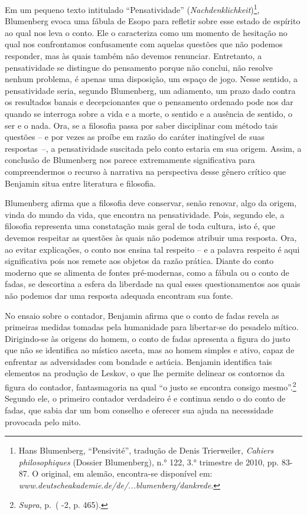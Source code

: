 Em um pequeno texto intitulado ``Pensatividade''
(\emph{Nachdenklichkeit})\footnote{Hans Blumenberg, ``Pensivité'',
  tradução de Denis Trierweiler, \emph{Cahiers philosophiques} (Dossier
  Blumenberg), n.° 122, 3.° trimestre de 2010, pp. 83-87. O original, em alemão,
  encontra-se disponível em: \emph{www.deutscheakademie.de/de/...blumenberg/dankrede}.}, Blumenberg
evoca uma fábula de Esopo para refletir sobre esse estado de espírito ao
qual nos leva o conto. Ele o caracteriza como um momento de hesitação no
qual nos confrontamos confusamente com aquelas questões que não podemos
responder, mas às quais também não devemos renunciar. Entretanto, a
pensatividade se distingue do pensamento porque não conclui, não resolve
nenhum problema, é apenas uma disposição, um espaço de jogo. Nesse
sentido, a pensatividade seria, segundo Blumenberg, um adiamento, um
prazo dado contra os resultados banais e decepcionantes que o pensamento
ordenado pode nos dar quando se interroga sobre a vida e a morte, o
sentido e a ausência de sentido, o ser e o nada. Ora, se a filosofia
passa por saber disciplinar com método tais questões -- e por vezes as
proíbe em razão do caráter inatingível de suas respostas~--, a
pensatividade suscitada pelo conto estaria em sua origem. Assim, a
conclusão de Blumenberg nos parece extremamente significativa para
compreendermos o recurso à narrativa na perspectiva desse gênero crítico
que Benjamin situa entre literatura e filosofia.

Blumenberg afirma que a filosofia deve conservar, senão renovar, algo da
origem, vinda do mundo da vida, que encontra na pensatividade. Pois,
segundo ele, a filosofia representa uma constatação mais geral de toda
cultura, isto é, que devemos respeitar as questões às quais não podemos
atribuir uma resposta. Ora, ao evitar explicações, o conto nos ensina
tal respeito -- e a palavra respeito é aqui significativa pois nos
remete aos objetos da razão prática. Diante do conto moderno que se
alimenta de fontes pré-modernas, como a fábula ou o conto de fadas, se
descortina a esfera da liberdade na qual esses questionamentos aos quais
não podemos dar uma resposta adequada encontram sua fonte.

No ensaio sobre o contador, Benjamin afirma que o conto de fadas revela
as primeiras medidas tomadas pela humanidade para libertar-se do
pesadelo mítico. Dirigindo-se às origens do homem, o conto de fadas
apresenta a figura do justo que não se identifica ao místico asceta, mas
ao homem simples e ativo, capaz de enfrentar as adversidades com bondade
e astúcia. Benjamin identifica tais elementos na produção de Leskov, o
que lhe permite delinear os contornos da figura do contador,
fantasmagoria na qual ``o justo se encontra consigo mesmo''.\footnote{\emph{Supra},
  p.\,\pageref{supra4} ( -2, p. 465).} Segundo ele, o primeiro contador verdadeiro é
e continua sendo o do conto de fadas, que sabia dar um bom conselho e
oferecer sua ajuda na necessidade provocada pelo mito.

